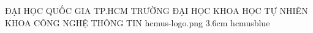 


\makeuniversitycover
  {ĐẠI HỌC QUỐC GIA TP.HCM}
  {TRƯỜNG ĐẠI HỌC KHOA HỌC TỰ NHIÊN}
  {KHOA CÔNG NGHỆ THÔNG TIN}
  {hcmus-logo.png}
  {3.6cm}
  {hcmusblue}
